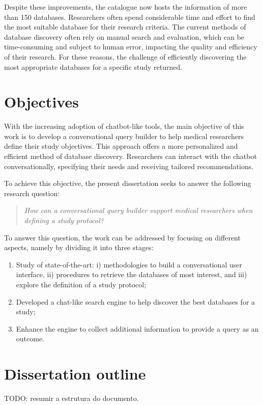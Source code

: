 Despite these improvements, the catalogue now hosts the information of more than 150 databases. Researchers often spend considerable time and effort to find the most suitable database for their research criteria. The current methods of database discovery often rely on manual search and evaluation, which can be time-consuming and subject to human error, impacting the quality and efficiency of their research. For these reasons, the challenge of efficiently discovering the most appropriate databases for a specific study returned. 



\section{Objectives}


With the increasing adoption of chatbot-like tools, the main objective of this work is to develop a conversational query builder to help medical researchers define their study objectives. This approach offers a more personalized and efficient method of database discovery. Researchers can interact with the chatbot conversationally, specifying their needs and receiving tailored recommendations. 

To achieve this objective, the present dissertation seeks to answer the following research question:

\begin{quote}
    \small\textit{How can a conversational query builder support medical researchers when defining a study protocol?}
\end{quote}

To answer this question, the work can be addressed by focusing on different aspects, namely by dividing it into three stages:

\begin{enumerate}
    \item Study of state-of-the-art: i) methodologies to build a conversational user interface, ii) procedures to retrieve the databases of most interest, and iii) explore the definition of a study protocol;
    \item Developed a chat-like search engine to help discover the best databases for a study;
    \item Enhance the engine to collect additional information to provide a query as an outcome. 
\end{enumerate}


\section{Dissertation outline}

TODO: resumir a estrutura do documento.
